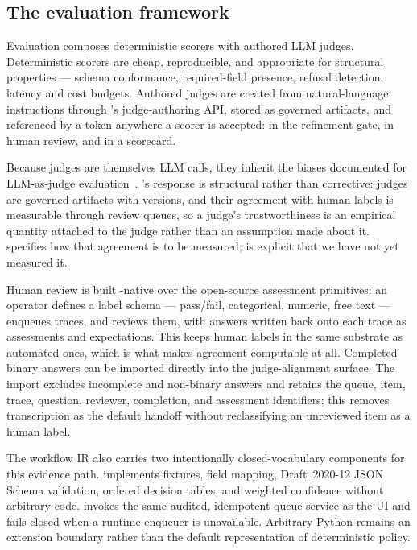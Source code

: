 \subsection{The evaluation framework}

Evaluation composes deterministic scorers with authored LLM judges. Deterministic
scorers are cheap, reproducible, and appropriate for structural properties ---
schema conformance, required-field presence, refusal detection, latency and cost
budgets. Authored judges are created from natural-language instructions through
\mlflow{}'s judge-authoring API, stored as governed artifacts, and referenced by a
 token anywhere a scorer is accepted: in the refinement gate, in
human review, and in a scorecard.

Because judges are themselves LLM calls, they inherit the biases documented for
LLM-as-judge evaluation~\cite{zheng2023judging,liu2023geval}. \sys's response is
structural rather than corrective: judges are governed artifacts with versions, and
their agreement with human labels is measurable through review queues, so a judge's
trustworthiness is an empirical quantity attached to the judge rather than an
assumption made about it.  specifies how that agreement is to
be measured;  is explicit that we have not yet measured it.

Human review is built \sys-native over the open-source assessment primitives:
an operator defines a label schema --- pass/fail, categorical, numeric, free text ---
enqueues traces, and reviews them, with answers written back onto each trace as
assessments and expectations. This keeps human labels in the same substrate as
automated ones, which is what makes agreement computable at all.
Completed binary answers can be imported directly into the judge-alignment
surface.  The import excludes incomplete and non-binary answers and retains the
queue, item, trace, question, reviewer, completion, and assessment identifiers;
this removes transcription as the default handoff without reclassifying an
unreviewed item as a human label.

The workflow IR also carries two intentionally closed-vocabulary components for
this evidence path.   implements fixtures, field mapping,
Draft~2020-12 JSON Schema validation, ordered decision tables, and weighted
confidence without arbitrary code.   invokes the
same audited, idempotent queue service as the UI and fails closed when a runtime
enqueuer is unavailable.  Arbitrary Python remains an extension boundary rather
than the default representation of deterministic policy.


